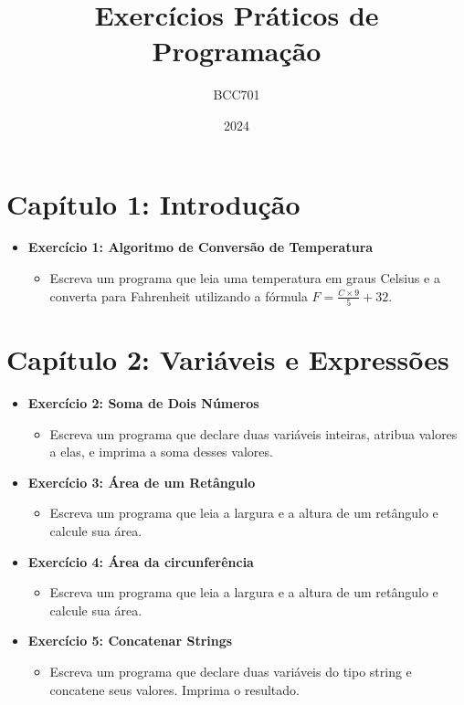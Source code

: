 \documentclass{article}
\title{Exercícios Práticos de Programação}
\author{BCC701}
\date{2024}
\begin{document}
\maketitle

\section*{Capítulo 1: Introdução}
\begin{itemize}
    \item \textbf{Exercício 1: Algoritmo de Conversão de Temperatura}
    \begin{itemize}
        \item Escreva um programa que leia uma temperatura em graus Celsius e a converta para Fahrenheit utilizando a fórmula \( F = \frac{C \times 9}{5} + 32 \).
    \end{itemize}
\end{itemize}

\section*{Capítulo 2: Variáveis e Expressões}
\begin{itemize}
    \item \textbf{Exercício 2: Soma de Dois Números}
    \begin{itemize}
        \item Escreva um programa que declare duas variáveis inteiras, atribua valores a elas, e imprima a soma desses valores.
    \end{itemize}
    \item \textbf{Exercício 3: Área de um Retângulo}
    \begin{itemize}
        \item Escreva um programa que leia a largura e a altura de um retângulo e calcule sua área.
    \end{itemize}
    \item \textbf{Exercício 4: Área da circunferência}
    \begin{itemize}
        \item Escreva um programa que leia a largura e a altura de um retângulo e calcule sua área.
    \end{itemize}
    \item \textbf{Exercício 5: Concatenar Strings}
    \begin{itemize}
        \item Escreva um programa que declare duas variáveis do tipo string e concatene seus valores. Imprima o resultado.
    \end{itemize}
\end{itemize}
\end{document}
